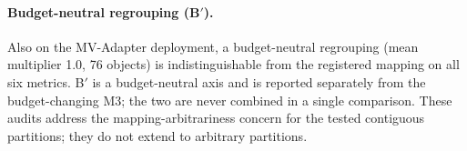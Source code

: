 \documentclass[10pt]{article}
\begin{document}
\paragraph{Budget-neutral regrouping (B$'$).}
Also on the MV-Adapter deployment, a budget-neutral regrouping (mean
multiplier 1.0, 76 objects) is indistinguishable from the registered
mapping on all six metrics. B$'$ is a budget-neutral axis and is reported
separately from the budget-changing M3; the two are never combined in a
single comparison. These audits address the mapping-arbitrariness concern
for the tested contiguous partitions; they do not extend to arbitrary
partitions.
\end{document}
